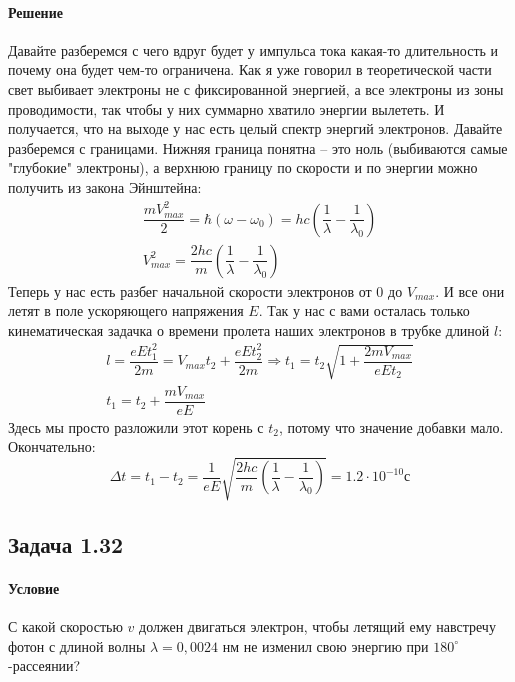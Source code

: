 \documentclass[12pt]{article}
\begin{document}
\paragraph{Решение}
Давайте разберемся с чего вдруг будет у импульса тока какая-то длительность и почему она будет чем-то ограничена. Как я уже говорил в теоретической части свет выбивает электроны не с фиксированной энергией, а все электроны из зоны проводимости, так чтобы у них суммарно хватило энергии вылететь. И получается, что на выходе у нас есть целый спектр энергий электронов. Давайте разберемся с границами. Нижняя граница понятна -- это ноль (выбиваются самые "глубокие" электроны), а верхнюю границу по скорости и по энергии можно получить из закона Эйнштейна:
\begin{gather*}
    \dfrac{mV_{max}^2}{2} = \hbar(\omega - \omega_0) = hc\left(\dfrac{1}{\lambda} - \dfrac{1}{\lambda_0} \right)\\
    V^2_{max} = \dfrac{2hc}{m}\left(\dfrac{1}{\lambda} - \dfrac{1}{\lambda_0} \right)
\end{gather*}
Теперь у нас есть разбег начальной скорости электронов от 0 до $V_{max}$. И все они летят в поле ускоряющего напряжения $E$. Так у нас с вами осталась только кинематическая задачка о времени пролета наших электронов в трубке длиной $l$:
\begin{gather*}
    l = \dfrac{eEt_1^2}{2m} = V_{max}t_2 +\dfrac{eEt_2^2}{2m} \Rightarrow t_1 = t_2\sqrt{1+\dfrac{2mV_{max}}{eEt_2}}\\
    t_1 = t_2 + \dfrac{mV_{max}}{eE}
\end{gather*}
Здесь мы просто разложили этот корень с $t_2$, потому что значение добавки мало. Окончательно:
\begin{equation*}
    \Delta t = t_1 - t_2 = \dfrac{1}{eE}\sqrt{\dfrac{2hc}{m}\left(\dfrac{1}{\lambda} - \dfrac{1}{\lambda_0} \right)} = 1.2\cdot10^{-10} \text{с}
\end{equation*}
\subsection{Задача 1.32}
\label{task_132}
\paragraph{Условие} С какой скоростью $v$ должен двигаться электрон, чтобы летящий ему навстречу фотон с длиной волны $\lambda = 0,0024$ нм не изменил свою энергию при $180^\circ$-рассеянии?
\end{document}
